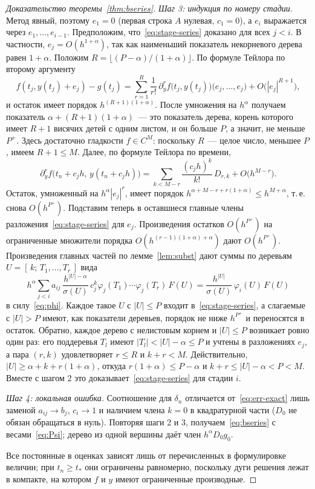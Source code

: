 \begin{proof}[Доказательство теоремы~\ref{thm:bseries}]
\emph{Шаг 3: индукция по номеру стадии.} Метод явный, поэтому $e_1=0$ (первая строка $A$ нулевая, $c_1=0$), а $e_i$ выражается через $e_1,\dots,e_{i-1}$. Предположим, что~\eqref{eq:stage-series} доказано для всех $j<i$. В частности, $e_j=O(h^{1+\alpha})$, так как наименьший показатель некорневого дерева равен $1+\alpha$. Положим $R=\lfloor(P-\alpha)/(1+\alpha)\rfloor$. По формуле Тейлора по второму аргументу
\[
f(t_j,y(t_j)+e_j)-g(t_j)=\sum_{r=1}^{R}\frac{1}{r!}\,\partial_y^rf\bigl(t_j,y(t_j)\bigr)\bigl(e_j,\dots,e_j\bigr)+O\bigl(|e_j|^{R+1}\bigr),
\]
и остаток имеет порядок $h^{(R+1)(1+\alpha)}$. После умножения на $h^{\alpha}$ получаем показатель $\alpha+(R+1)(1+\alpha)$~--- это показатель дерева, корень которого имеет $R+1$ висячих детей с одним листом, и он больше $P$, а значит, не меньше $P^{+}$. Здесь достаточно гладкости $f\in C^{M}$: поскольку $R$~--- целое число, меньшее $P$, имеем $R+1\le M$. Далее, по формуле Тейлора по времени,
\[
\partial_y^rf\bigl(t_n+c_jh,\,y(t_n+c_jh)\bigr)=\sum_{k<M-r}\frac{(c_jh)^k}{k!}\,D_{r,k}+O\bigl(h^{M-r}\bigr).
\]
Остаток, умноженный на $h^{\alpha}|e_j|^r$, имеет порядок $h^{\alpha+M-r+r(1+\alpha)}\le h^{M+\alpha}$, т.\,е. снова $O(h^{P^{+}})$. Подставим теперь в оставшиеся главные члены разложения~\eqref{eq:stage-series} для $e_j$. Произведения остатков $O(h^{P^{+}})$ на ограниченные множители порядка $O(h^{(r-1)(1+\alpha)+\alpha})$ дают $O(h^{P^{+}})$. Произведения главных частей по лемме~\ref{lem:subst} дают суммы по деревьям $U=[\,k;\,T_1,\dots,T_r\,]$ вида
\[
h^{\alpha}\sum_{j<i}a_{ij}\,\frac{h^{|U|-\alpha}}{\sigma(U)}\,c_j^{k}\varphi_j(T_1)\cdots\varphi_j(T_r)\,F(U)=\frac{h^{|U|}}{\sigma(U)}\,\varphi_i(U)\,F(U)
\]
в силу~\eqref{eq:phi}. Каждое такое $U$ с $|U|\le P$ входит в~\eqref{eq:stage-series}, а слагаемые с $|U|>P$ имеют, как показатели деревьев, порядок не ниже $h^{P^{+}}$ и переносятся в остаток. Обратно, каждое дерево с нелистовым корнем и $|U|\le P$ возникает ровно один раз: его поддеревья $T_l$ имеют $|T_l|<|U|-\alpha\le P$ и учтены в разложениях $e_j$, а пара $(r,k)$ удовлетворяет $r\le R$ и $k+r<M$. Действительно, $|U|\ge\alpha+k+r(1+\alpha)$, откуда $r(1+\alpha)\le P-\alpha$ и $k+r\le|U|-\alpha<P<M$. Вместе с шагом 2 это доказывает~\eqref{eq:stage-series} для стадии $i$.

\emph{Шаг 4: локальная ошибка.} Соотношение для $\delta_n$ отличается от~\eqref{eq:err-exact} лишь заменой $a_{ij}\to b_j$, $c_i\to1$ и наличием члена $k=0$ в квадратурной части ($D_0$ не обязан обращаться в нуль). Повторяя шаги 2 и 3, получаем~\eqref{eq:bseries} с весами~\eqref{eq:Psi}; дерево из одной вершины даёт член $h^{\alpha}D_0g_0$.

Все постоянные в оценках зависят лишь от перечисленных в формулировке величин; при $t_n\ge t_*$ они ограничены равномерно, поскольку дуги решения лежат в компакте, на котором $f$ и $y$ имеют ограниченные производные.
\end{proof}

